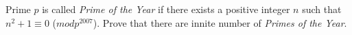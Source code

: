 Prime $p$ is called \textit{Prime of the Year} if there exists a positive integer $n$ such that $n^2+ 1 \equiv 0$ ($mod p^{2007}$). Prove that there are innite number of \textit{Primes of the Year}.